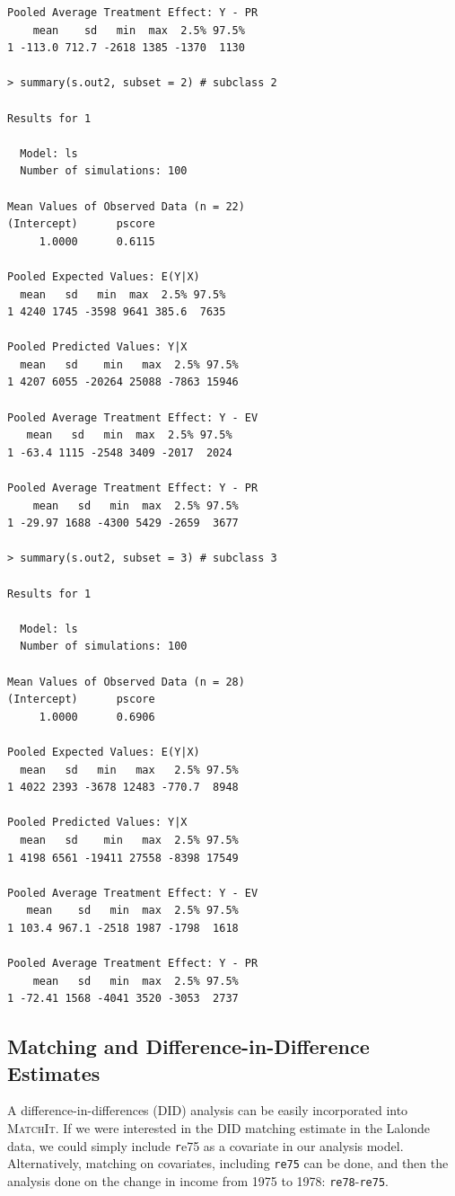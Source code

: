 \documentclass[oneside,letterpaper,titlepage]{article}
\newcommand{\MatchIt}{\textsc{MatchIt}}
\begin{document}
\begin{verbatim}
Pooled Average Treatment Effect: Y - PR
    mean    sd   min  max  2.5% 97.5%
1 -113.0 712.7 -2618 1385 -1370  1130

> summary(s.out2, subset = 2) # subclass 2

Results for 1 

  Model: ls 
  Number of simulations: 100 

Mean Values of Observed Data (n = 22) 
(Intercept)      pscore 
     1.0000      0.6115 

Pooled Expected Values: E(Y|X)
  mean   sd   min  max  2.5% 97.5%
1 4240 1745 -3598 9641 385.6  7635

Pooled Predicted Values: Y|X
  mean   sd    min   max  2.5% 97.5%
1 4207 6055 -20264 25088 -7863 15946

Pooled Average Treatment Effect: Y - EV
   mean   sd   min  max  2.5% 97.5%
1 -63.4 1115 -2548 3409 -2017  2024

Pooled Average Treatment Effect: Y - PR
    mean   sd   min  max  2.5% 97.5%
1 -29.97 1688 -4300 5429 -2659  3677

> summary(s.out2, subset = 3) # subclass 3

Results for 1 

  Model: ls 
  Number of simulations: 100 

Mean Values of Observed Data (n = 28) 
(Intercept)      pscore 
     1.0000      0.6906 

Pooled Expected Values: E(Y|X)
  mean   sd   min   max   2.5% 97.5%
1 4022 2393 -3678 12483 -770.7  8948

Pooled Predicted Values: Y|X
  mean   sd    min   max  2.5% 97.5%
1 4198 6561 -19411 27558 -8398 17549

Pooled Average Treatment Effect: Y - EV
   mean    sd   min  max  2.5% 97.5%
1 103.4 967.1 -2518 1987 -1798  1618

Pooled Average Treatment Effect: Y - PR
    mean   sd   min  max  2.5% 97.5%
1 -72.41 1568 -4041 3520 -3053  2737

\end{verbatim}

\subsection{Matching and Difference-in-Difference Estimates}
A difference-in-differences (DID) analysis can be easily incorporated
into \MatchIt.  If we were interested in the DID matching estimate in
the Lalonde data, we could simply include {\texttt re75} as a
covariate in our analysis model.  Alternatively, matching on
covariates, including {\tt re75} can be done, and then the analysis
done on the change in income from 1975 to 1978: {\tt re78}-{\tt re75}.
\end{document}
